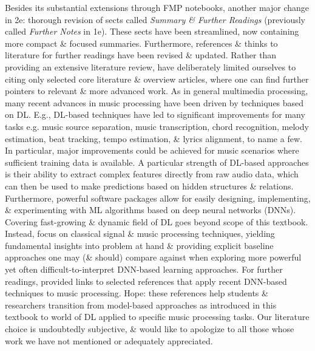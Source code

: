 \documentclass{article}
\begin{document}
\begin{itemize}
	Besides its substantial extensions through FMP notebooks, another major change in 2e: thorough revision of sects called {\it Summary \& Further Readings} (previously called {\it Further Notes} in 1e). These sects have been streamlined, now containing more compact \& focused summaries. Furthermore, references \& thinks to literature for further readings have been revised \& updated. Rather than providing an extensive literature review, have deliberately limited ourselves to citing only selected core literature \& overview articles, where one can find further pointers to relevant \& more advanced work. As in general multimedia processing, many recent advances in music processing have been driven by techniques based on DL. E.g., DL-based techniques have led to significant improvements for many tasks e.g. music source separation, music transcription, chord recognition, melody estimation, beat tracking, tempo estimation, \& lyrics alignment, to name a few. In particular, major improvements could be achieved for music scenarios where sufficient training data is available. A particular strength of DL-based approaches is their ability to extract complex features directly from raw audio data, which can then be used to make predictions based on hidden structures \& relations. Furthermore, powerful software packages allow for easily designing, implementing, \& experimenting with ML algorithms based on deep neural networks (DNNs). Covering fast-growing \& dynamic field of DL goes beyond scope of this textbook. Instead, focus on classical signal \& music processing techniques, yielding fundamental insights into problem at hand \& providing explicit baseline approaches one may (\& should) compare against when exploring more powerful yet often difficult-to-interpret DNN-based learning approaches. For further readings, provided links to selected references that apply recent DNN-based techniques to music processing. Hope: these references help students \& researchers transition from model-based approaches as introduced in this textbook to world of DL applied to specific music processing tasks. Our literature choice is undoubtedly subjective, \& would like to apologize to all those whose work we have not mentioned or adequately appreciated.
	

\end{itemize}
\end{document}
